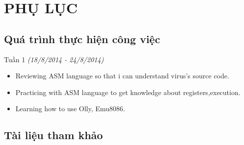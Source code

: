
\newpage
\chapter{PHỤ LỤC}

\section{Quá trình thực hiện công việc}

\hspace{0.5cm}Tuần 1 \textit{(18/8/2014 - 24/8/2014)}
\begin{itemize}
\item{Reviewing ASM language so that i can understand virus's source code.}
\item{Practicing with ASM language to get knowledge about registers,execution.}
\item{Learning how to use Olly, Emu8086.}
\end{itemize}

\section{Tài liệu tham khảo}

\begin{thebibliography}{}

\end{thebibliography}




